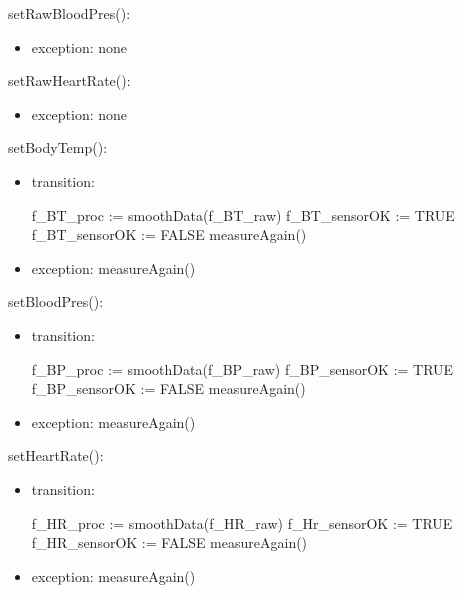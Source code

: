 \documentclass{article}
\begin{document}
\begin{description}
        \noindent setRawBloodPres():
        \begin{itemize}
        \item exception: none
        \end{itemize}
        
        \noindent setRawHeartRate():
        \begin{itemize}
        \item exception: none
        \end{itemize}
        
        \noindent setBodyTemp():
        \begin{itemize}
        \item transition: \\
        \begin{algorithmic}
            \State 
            f\_BT\_proc := smoothData({f\_BT\_raw})
            \State 
            f\_BT\_sensorOK := TRUE
        \Else
            \State 
            f\_BT\_sensorOK := FALSE
            \State 
            measureAgain()
        \EndIf 
        \end{algorithmic}
        \item exception: measureAgain()
        
        \end{itemize}
        
        \noindent setBloodPres():
        \begin{itemize}
        \item transition: \\
        \begin{algorithmic}
            \State 
            f\_BP\_proc := smoothData({f\_BP\_raw})
            \State 
            f\_BP\_sensorOK := TRUE
        \Else
            \State 
            f\_BP\_sensorOK := FALSE
            \State 
            measureAgain()
        \EndIf 
        \end{algorithmic}
        \item exception: measureAgain()
        \end{itemize}
        
        \noindent setHeartRate():
        \begin{itemize}
        \item transition: \\
        \begin{algorithmic}
            \State 
            f\_HR\_proc := smoothData({f\_HR\_raw})
            \State 
            f\_Hr\_sensorOK := TRUE
        \Else
            \State 
            f\_HR\_sensorOK := FALSE
            \State 
            measureAgain()
        \EndIf 
        \end{algorithmic}
        \item exception: measureAgain()
        \end{itemize}
        

\end{description}
\end{document}

